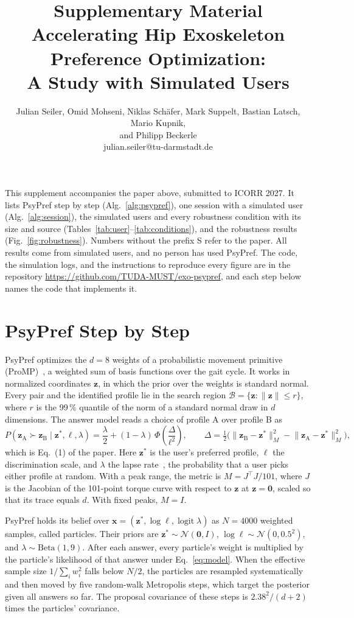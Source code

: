 \documentclass[10pt,a4paper]{article}
\title{Supplementary Material\\[4pt]\large Accelerating Hip Exoskeleton Preference Optimization:\\
A Study with Simulated Users}
\author{Julian Seiler, Omid Mohseni, Niklas Sch\"afer, Mark Suppelt, Bastian Latsch, Mario Kupnik,\\
and Philipp Beckerle\\[2pt]\small julian.seiler@tu-darmstadt.de}
\date{}
\newcommand{\z}{\mathbf z}
\begin{document}
\maketitle

This supplement accompanies the paper above, submitted to ICORR 2027. It lists PsyPref step by step (Alg.~\ref{alg:psypref}),
one session with a simulated user (Alg.~\ref{alg:session}), the simulated users and every robustness condition with its
size and source (Tables~\ref{tab:user}--\ref{tab:conditions}), and the robustness results (Fig.~\ref{fig:robustness}).
Numbers without the prefix S refer to the paper. All results come from simulated users, and no person has used PsyPref.
The code, the simulation logs, and the instructions to reproduce every figure are in the repository
\url{https://github.com/TUDA-MUST/exo-psypref}, and each step below names the code that implements it.

\section{PsyPref Step by Step}
\label{sec:psypref}

PsyPref optimizes the $d = 8$ weights of a probabilistic movement primitive (ProMP)~\cite{paraschos}, a weighted sum of
basis functions over the gait cycle. It works in normalized coordinates $\z$, in which the prior over the weights is
standard normal. Every pair and the identified profile lie in the search region $\mathcal B = \{\z : \lVert\z\rVert \le
r\}$, where $r$ is the 99\,\% quantile of the norm of a standard normal draw in $d$ dimensions. The answer model reads a
choice of profile A over profile B as
\begin{equation}
P(\z_\mathrm{A}\succ\z_\mathrm{B}\mid\z^\ast,\ell,\lambda)=\frac{\lambda}{2}+(1-\lambda)\,\Phi\!\left(\frac{\Delta}{\ell^2}\right),
\qquad
\Delta=\tfrac12\bigl(\lVert\z_\mathrm{B}-\z^\ast\rVert_M^2-\lVert\z_\mathrm{A}-\z^\ast\rVert_M^2\bigr),
\label{eq:model}
\end{equation}
which is Eq.~(1) of the paper. Here $\z^\ast$ is the user's preferred profile, $\ell$ the discrimination scale, and
$\lambda$ the lapse rate~\cite{wichmann}, the probability that a user picks either profile at random. With a peak range, the metric is $M = J^\top J/101$, where $J$ is the Jacobian
of the 101-point torque curve with respect to $\z$ at $\z = \mathbf 0$, scaled so that its trace equals $d$. With fixed
peaks, $M = I$.

PsyPref holds its belief over $\mathbf x = (\z^\ast, \log\ell, \operatorname{logit}\lambda)$ as $N = 4000$ weighted
samples, called particles. Their priors are $\z^\ast\sim\mathcal N(\mathbf 0,I)$, $\log\ell\sim\mathcal N(0,0.5^2)$, and
$\lambda\sim\mathrm{Beta}(1,9)$. After each answer, every particle's weight is multiplied by the particle's likelihood of
that answer under Eq.~\eqref{eq:model}. When the effective sample size $1/\sum_i w_i^2$ falls below $N/2$, the particles
are resampled systematically and then moved by five random-walk Metropolis steps, which target the posterior given all
answers so far. The proposal covariance of these steps is $2.38^2/(d+2)$ times the particles' covariance.
\end{document}
